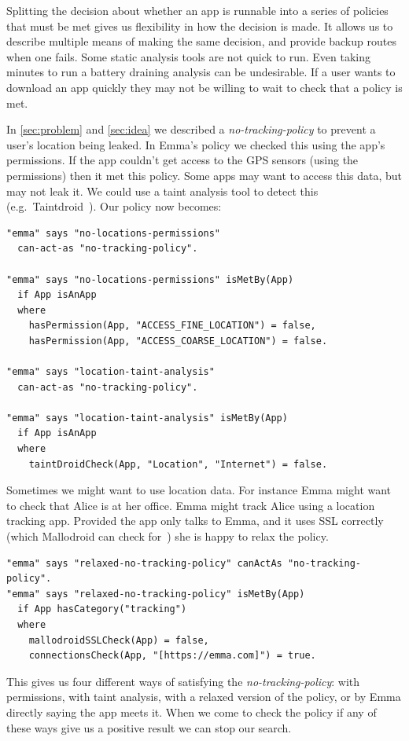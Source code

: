 \documentclass[]{llncs}
\begin{document}
Splitting the decision about whether an app is runnable into a series of policies that must be met gives us flexibility in how the decision is made.
It allows us to describe multiple means of making the same decision, and provide backup routes when one fails.
Some static analysis tools are not quick to run.
Even taking minutes to run a battery draining analysis can be undesirable.
If a user wants to download an app quickly they may not be willing to wait to check that a policy is met.

In \autoref{sec:problem} and \autoref{sec:idea} we described a \emph{no-tracking-policy} to prevent a user's location being leaked.
In Emma's policy we checked this using the app's permissions.
If the app couldn't get access to the GPS sensors (using the permissions) then it met this policy.
Some apps may want to access this data, but may not leak it.
We could use a taint analysis tool to detect this (e.g.~Taintdroid~\cite{Fritz:2013vi}).
Our policy now becomes:

\begin{lstlisting}
"emma" says "no-locations-permissions"
  can-act-as "no-tracking-policy".

"emma" says "no-locations-permissions" isMetBy(App)
  if App isAnApp
  where
    hasPermission(App, "ACCESS_FINE_LOCATION") = false,
    hasPermission(App, "ACCESS_COARSE_LOCATION") = false.

"emma" says "location-taint-analysis"
  can-act-as "no-tracking-policy".

"emma" says "location-taint-analysis" isMetBy(App)
  if App isAnApp
  where
    taintDroidCheck(App, "Location", "Internet") = false.
\end{lstlisting}

Sometimes we might want to use location data.
For instance Emma might want to check that Alice is at her office.
Emma might track Alice using a location tracking app.
Provided the app only talks to Emma, and it uses SSL correctly (which Mallodroid can check for~\cite{Fahl:2012dj}) she is happy to relax the policy.

\begin{lstlisting}
"emma" says "relaxed-no-tracking-policy" canActAs "no-tracking-policy".
"emma" says "relaxed-no-tracking-policy" isMetBy(App)
  if App hasCategory("tracking")
  where
    mallodroidSSLCheck(App) = false,
    connectionsCheck(App, "[https://emma.com]") = true.
\end{lstlisting}

This gives us four different ways of satisfying the \emph{no-tracking-policy}:
  with permissions,
  with taint analysis,
  with a relaxed version of the policy,
  or by Emma directly saying the app meets it.
When we come to check the policy if any of these ways give us a positive result we can stop our search.
\end{document}
